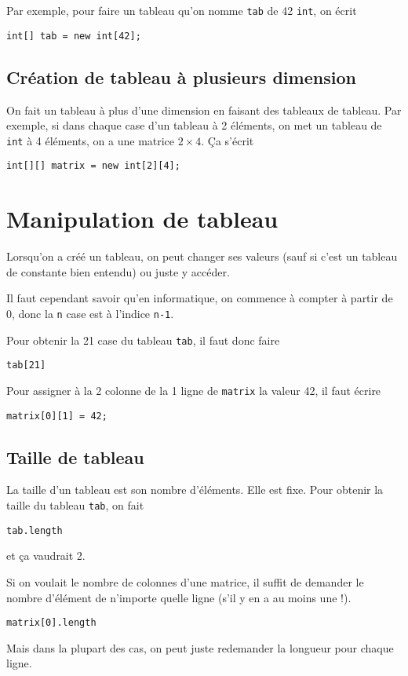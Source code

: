 Par exemple, pour faire un tableau qu'on nomme \verb|tab| de 42 \verb|int|,
on écrit
\begin{lstlisting}
int[] tab = new int[42];
\end{lstlisting}

\subsection{Création de tableau à plusieurs dimension}
On fait un tableau à plus d'une dimension en faisant des tableaux de tableau.
Par exemple, si dans chaque case d'un tableau à 2 éléments, on met un
tableau de \verb|int| à 4 éléments, on a une matrice $2 \times 4$.
Ça s'écrit
\begin{lstlisting}
int[][] matrix = new int[2][4];
\end{lstlisting}

\section{Manipulation de tableau}
Lorsqu'on a créé un tableau, on peut changer ses valeurs (sauf si c'est un
tableau de constante bien entendu) ou juste y accéder.

Il faut cependant savoir qu'en informatique, on commence à compter à partir
de 0, donc la \verb|n|\ieme{} case est à l'indice \verb|n-1|.

Pour obtenir la 21\ieme{} case du tableau \verb|tab|, il faut donc faire
\begin{lstlisting}
tab[21]
\end{lstlisting}

Pour assigner à la 2\ieme{} colonne de la 1\iere{} ligne de \verb|matrix|
la valeur 42, il faut écrire
\begin{lstlisting}
matrix[0][1] = 42;
\end{lstlisting}

\subsection{Taille de tableau}
La taille d'un tableau est son nombre d'éléments.
Elle est fixe.
Pour obtenir la taille du tableau \verb|tab|, on fait
\begin{lstlisting}
tab.length
\end{lstlisting}
et ça vaudrait 2.

Si on voulait le nombre de colonnes d'une matrice, il suffit de demander
le nombre d'élément de n'importe quelle ligne (s'il y en a au moins une !).
\begin{lstlisting}
matrix[0].length
\end{lstlisting}
Mais dans la plupart des cas,
on peut juste redemander la longueur pour chaque ligne.

